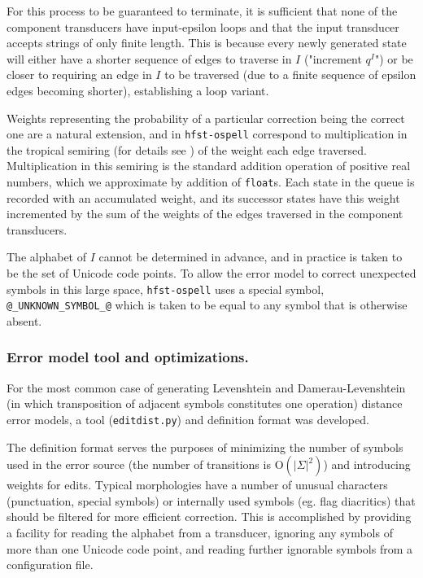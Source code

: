 \documentclass{llncs}
\begin{document}
For this process to be guaranteed to terminate, it is sufficient that none of
the component transducers have input-epsilon loops and that the input
transducer accepts strings of only finite length. This is because every newly
generated state will either have a shorter sequence of edges to traverse in
$I$ ("increment $q^I$") or be closer to requiring an edge in $I$ to be traversed
(due to a finite sequence of epsilon edges becoming shorter), establishing a
loop variant.

Weights representing the probability of a particular correction being the
correct one are a natural extension, and in \verb!hfst-ospell! correspond to
multiplication in the tropical semiring (for details see \cite{openfst/2007})
of the weight each edge
traversed. Multiplication in this semiring is the standard addition operation
of positive real numbers, which we approximate by addition of \verb!float!s.
Each state in the queue is recorded with an accumulated weight, and its
successor states have this weight incremented by the sum of the weights of
the edges traversed in the component transducers.

The alphabet of $I$ cannot be determined in advance, and in practice is taken
to be the set of Unicode code points. To allow the error model to correct
unexpected symbols in this large space, \verb!hfst-ospell! uses a special
symbol, \verb!@_UNKNOWN_SYMBOL_@! which is taken to be equal to any symbol
that is otherwise absent.

\subsubsection{Error model tool and optimizations.}
For the most common case of generating Levenshtein and
Damerau-Levenshtein (in which transposition of adjacent symbols constitutes
one operation) distance error models, a tool (\verb!editdist.py!) and
definition format was developed.

The definition format serves the purposes of minimizing the number of symbols
used in the error source (the number of transitions is $\mathrm{O}(|\Sigma|^2)$)
and introducing weights for edits. Typical
morphologies have a number of unusual characters (punctuation, special symbols)
or internally used symbols (eg. flag diacritics) that should be filtered for
more efficient correction. This is accomplished by providing a facility for
reading the alphabet from a transducer, ignoring any symbols of more than
one Unicode code point, and reading further ignorable symbols from a
configuration file.
\end{document}
